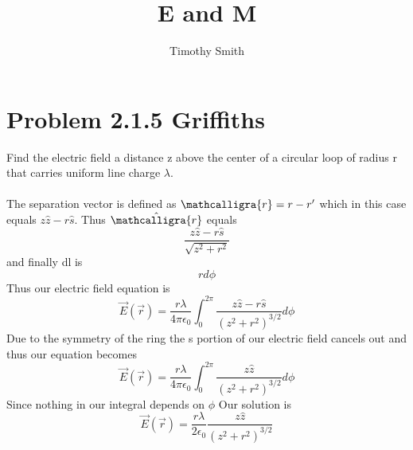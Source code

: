 \documentclass{article}
\begin{document}
\author{Timothy Smith}
\title{E and M}
\maketitle

\newcommand{\scripty}[1]{\ensuremath{\mathcalligra{#1}}}

\section*{Problem 2.1.5 Griffiths }

Find the electric field a distance z above the center of a circular loop of radius r that carries uniform line charge $\lambda$. 
\\
\\
The separation vector is defined as  $\scripty{r}=r-r'$ which in this case equals $z\hat{z}-r\hat{s}$. Thus $\hat{\scripty{r}}$ equals 
$$ \frac{z\hat{z}-r\hat{s}}{\sqrt{z^2+r^2}}$$
and finally dl is
$$rd\phi$$
Thus our electric field equation is 
\begin{equation}
 \vec{E}(\vec{r})
=
\frac{r\lambda}{4\pi\epsilon_0}\int_{0}^{2\pi}\frac{z\hat{z}-r\hat{s}}{(z^2+r^2)^{3/2}}d\phi
\end{equation}
Due to the symmetry of the ring the s portion of our electric field cancels out and thus our equation becomes
\begin{equation}
 \vec{E}(\vec{r})
=
\frac{r\lambda}{4\pi\epsilon_0}\int_{0}^{2\pi}\frac{z\hat{z}}{(z^2+r^2)^{3/2}}d\phi
\end{equation}
Since nothing in our integral depends on $\phi$
Our solution is 
\begin{equation}
 \vec{E}(\vec{r})
=
\frac{r\lambda}{2\epsilon_0}\frac{z\hat{z}}{(z^2+r^2)^{3/2}}
\end{equation}
\end{document}
